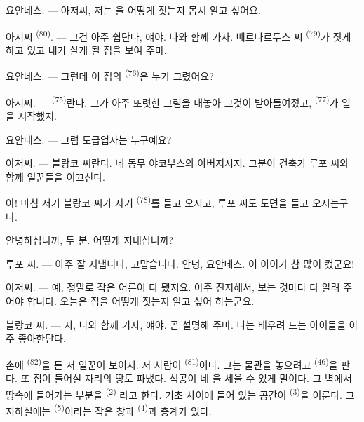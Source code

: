 \VUsaut{6.0mm}
\VUsaut{1.4mm}
\VUsaut{2.2mm}

\VUsaut{3.0mm}

\textsc{요안네스}. --- 아저씨, 저는 을 어떻게 짓는지 몹시 알고 싶어요.

\textsc{아저씨} \textsuperscript{(80)}. --- 그건 아주 쉽단다, 얘야. 나와 함께 가자.
베르나르두스 씨 \textsuperscript{(79)}가 짓게 하고 있고 내가 살게 될 집을 보여 주마.

\textsc{요안네스}. --- 그런데 이 집의  \textsuperscript{(76)}은 누가
그렸어요?

\textsc{아저씨}. ---  \textsuperscript{(75)}란다. 그가 아주 또렷한 그림을
내놓아 그것이 받아들여졌고,  \textsuperscript{(77)}가 일을 시작했지.

\textsc{요안네스}. --- 그럼 도급업자는 누구예요?

\textsc{아저씨}. --- 블랑코 씨란다. 네 동무 야코부스의 아버지시지. 그분이 건축가 루포
씨와 함께 일꾼들을 이끄신다.

아! 마침 저기 블랑코 씨가 자기  \textsuperscript{(78)}를 들고 오시고, 루포
씨도 도면을 들고 오시는구나.

안녕하십니까, 두 분. 어떻게 지내십니까?

\textsc{루포 씨}. --- 아주 잘 지냅니다, 고맙습니다. 안녕, 요안네스. 이 아이가 참 많이
컸군요!

\textsc{아저씨}. --- 예, 정말로 작은 어른이 다 됐지요. 아주 진지해서, 보는 것마다 다
알려 주어야 합니다. 오늘은 집을 어떻게 짓는지 알고 싶어 하는군요.

\VUsaut{3.0mm}

\textsc{블랑코 씨}. --- 자, 나와 함께 가자, 얘야. 곧 설명해 주마. 나는 배우려 드는
아이들을 아주 좋아한단다.

손에  \textsuperscript{(82)}을 든 저 일꾼이 보이지. 저 사람이
 \textsuperscript{(81)}이다. 그는 물관을 놓으려고 
\textsuperscript{(46)}을 판다. 또 집이 들어설 자리의 땅도 파냈다. 석공이 네 을
세울 수 있게 말이다. 그 벽에서 땅속에 들어가는 부분을  \textsuperscript{(2)}
라고 한다. 기초 사이에 들어 있는 공간이  \textsuperscript{(3)}을 이룬다. 그
지하실에는  \textsuperscript{(5)}이라는 작은 창과 
\textsuperscript{(4)}과 층계가 있다.


